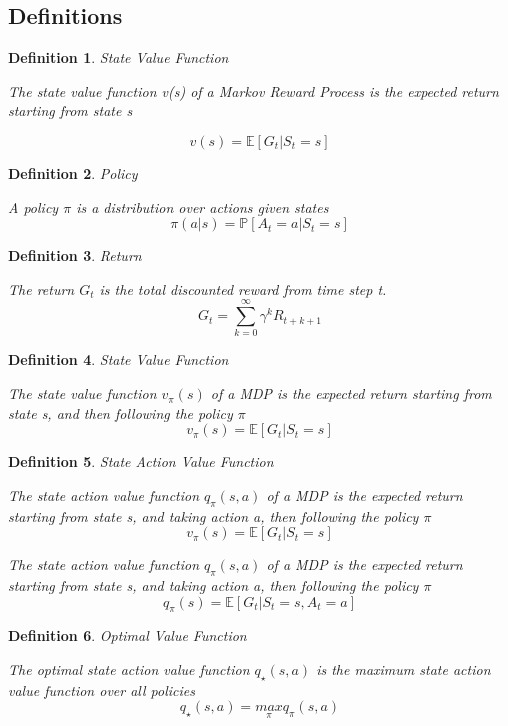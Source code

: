 \documentclass[12pt,a4paper]{article}
\newtheorem{definition}{Definition}
\begin{document}
\subsection{Definitions}

\begin{definition}{State Value Function}

The state value function v(s) of a Markov Reward Process is the expected return starting from state s

\[ 
v(s) = \mathbb{E}[G_{t} \vert S_{t}=s]
\]
\end{definition}

\begin{definition}{Policy}

A policy $\pi$ is a distribution over actions given states
\[ 
\pi(a\vert s) = \mathbb{P}[A_{t}=a \vert S_{t}=s]
\]
\end{definition}

\begin{definition}{Return}

The return $G_{t}$ is the total discounted reward from time step t.
\[ 
G_{t} = \sum_{k=0}^{\infty}{\gamma^{k}R_{t+k+1}}
\]
\end{definition}

\begin{definition}{State Value Function}

The state value function $v_{\pi}(s)$ of a MDP is the expected return starting from state s, and then following the policy $\pi$
\[ 
v_{\pi}(s) = \mathbb{E}[G_{t} \vert S_{t}=s]
\]
\end{definition}

\begin{definition}{State Action Value Function}

The state action value function $q_{\pi}(s, a)$ of a MDP is the expected return starting from state s, and taking action a, then following the policy $\pi$
\[ 
v_{\pi}(s) = \mathbb{E}[G_{t} \vert S_{t}=s]
\]

The state action value function $q_{\pi}(s, a)$ of a MDP is the expected return starting from state s, and taking action a, then following the policy $\pi$
\[ 
q_{\pi}(s) = \mathbb{E}[G_{t} \vert S_{t}=s, A_{t}=a]
\]

\end{definition}

\begin{definition}{Optimal Value Function}

The optimal state action value function $q_{\star}(s, a)$ is the maximum state action value function over all policies
\[ 
q_{\star}(s, a) = \underset{\pi}{max}{q_{\pi}(s, a)}
\]
\end{definition}
\end{document}
